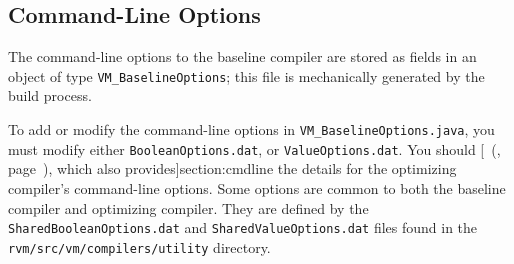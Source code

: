 \subsection{Command-Line Options}%

The command-line options to the baseline compiler are
stored as fields in an object of type {\tt VM\_BaselineOptions}; this
file is mechanically generated by the build process. 

To add or modify the command-line options in {\tt VM\_BaselineOptions.java},
you must modify either {\tt BooleanOptions.dat}, or {\tt ValueOptions.dat}.
You should [~(\Ref, page~\Pageref{}), which also
  provides]{section:cmdline} the
details for the optimizing compiler's command-line options.
Some options are common to both the baseline compiler and optimizing
compiler. They are defined by the {\tt SharedBooleanOptions.dat} and
{\tt SharedValueOptions.dat} files found in the
{\tt rvm/\-src/\-vm/\-com\-pi\-lers/\-u\-til\-i\-ty} directory. 
